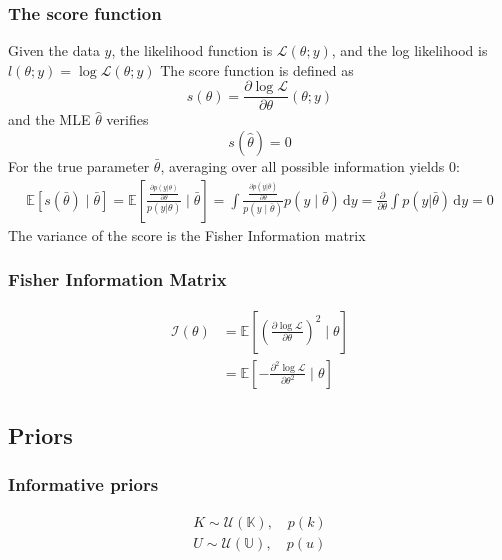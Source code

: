\documentclass[a4paper,11pt]{article}
\newcommand{\Ex}{\mathbb{E}}
\theoremstyle{defi}
\numberwithin{thmCounter}{section}
\begin{document}
\subsubsection{The score function}
\label{sec:score_function}
Given the data $y$, the likelihood function is $\mathcal{L}(\theta ; y)$, and the log likelihood is $l(\theta;y) = \log \mathcal{L}(\theta;y)$
The score function is defined as
\begin{equation}
  \label{eq:def_score_function}
  s(\theta) = \frac{\partial \log \mathcal{L}}{\partial \theta}(\theta; y)
\end{equation}
and the MLE $\hat{\theta}$ verifies
\begin{equation}
  \label{eq:MLE}
  s(\hat{\theta}) = 0
\end{equation}
For the true parameter $\bar{\theta}$, averaging over all possible information yields $0$:
\begin{align}
  \Ex\left[s(\bar{\theta}) \mid \bar{\theta}\right] = \Ex\left[\frac{\frac{\partial p(y|\theta)}{\partial \theta}}{p(y|\theta)} \mid \bar{\theta}\right] = \int \frac{\frac{\partial p(y|\bar\theta)}{\partial \theta}}{p(y\mid\bar\theta)} p (y \mid \bar\theta) \,\mathrm{d}y = \frac{\partial}{\partial \theta} \int p(y|\bar\theta) \,\mathrm{d}y = 0
\end{align}
The variance of the score is the Fisher Information matrix

\subsubsection{Fisher Information Matrix}
\label{sec:fisher_information_matrix}
\begin{align}
  \label{eq:def_fisher_information_matrix}
  \mathcal{I}(\theta) &= \Ex\left[\left(\frac{\partial \log \mathcal{L}}{\partial \theta}\right)^2 \mid \theta\right] \\
                        &=\Ex\left[-\frac{\partial^2 \log \mathcal{L}}{\partial \theta^2} \mid \theta\right]
\end{align}

\subsection{Priors}
\subsubsection{Informative priors}
\label{sec:informative_priors}

\begin{align*}
  K \sim \mathcal{U}(\mathbb{K}), \quad p(k) \\
  U \sim \mathcal{U}(\mathbb{U}), \quad p(u)
\end{align*}
\end{document}
